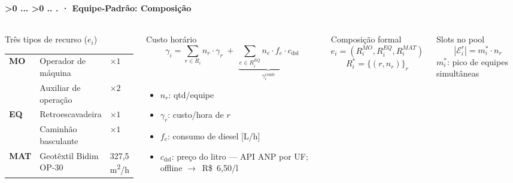 \documentclass[aspectratio=169,10pt]{beamer}
\newcommand{\arr}{$\rightarrow$}
\newcounter{mlc3}[subsection]
\newcounter{mlc4}[mlc3]
\newcommand{\pathnum}{%
  \ifnum\value{mlc4}>0
    \thesection.\thesubsection.\arabic{mlc3}.\arabic{mlc4}%
  \else\ifnum\value{mlc3}>0
    \thesection.\thesubsection.\arabic{mlc3}%
  \else
    \thesection.\thesubsection%
  \fi\fi
}
\newcommand{\lvlA}{\stepcounter{mlc3}}   %
\newcommand{\mtitle}[1]{%
  \frametitle{\insertsection}%
  \framesubtitle{\pathnum\;·\; #1}}
\begin{document}
\lvlA
\begin{frame}
  \mtitle{Equipe-Padrão: Composição}
  \begin{columns}[T]
    \begin{block}{Três tipos de recurso ($e_i$)}
      \scriptsize
      \begin{tabular}{@{}lll@{}}
        \textbf{MO}  & Operador de máquina & $\times 1$ \\
                     & Auxiliar de operação & $\times 2$ \\
        \textbf{EQ}  & Retroescavadeira & $\times 1$ \\
                     & Caminhão basculante & $\times 1$ \\
        \textbf{MAT} & Geotêxtil Bidim OP-30 & 327,5 m\textsuperscript{2}/h \\
      \end{tabular}
    \end{block}
    \vspace{4pt}
    \begin{block}{Custo horário}
      \vspace{-4pt}
      \[
        \gamma_i = \sum_{r \in R_i} n_r \cdot \gamma_r
        \;+\; \underbrace{\sum_{e \in R_i^{EQ}} n_e \cdot f_e \cdot c_{\text{dsl}}}_{\gamma_i^{\text{comb}}}
      \]
      \vspace{-6pt}
      \begin{itemize}\scriptsize\setlength{\itemsep}{0pt}\setlength{\topsep}{0pt}\setlength{\parskip}{0pt}
        \item $n_r$: qtd/equipe
        \item $\gamma_r$: custo/hora de $r$
        \item $f_e$: consumo de diesel [L/h]
        \item $c_{\text{dsl}}$: preço do litro --- API ANP por UF; offline \arr\ R\$~6,50/l
      \end{itemize}
    \end{block}
    \begin{block}{Composição formal}
      \[
        e_i = (R_i^{MO}, R_i^{EQ}, R_i^{MAT})
      \]
      \[
        R_i^{*} = \{(r, n_r)\}_r
      \]
    \end{block}
    \vspace{4pt}
    \begin{block}{Slots no pool}
      \[
        |\mathcal{E}_i^r| = m_i^{*} \cdot n_r
      \]
      $m_i^{*}$: pico de equipes simultâneas
    \end{block}
  \end{columns}
\end{frame}
\end{document}
